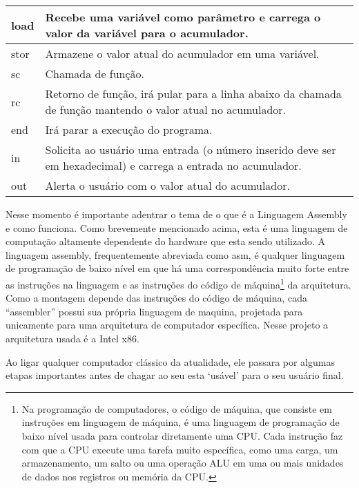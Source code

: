 \begin{longtable}{ |p{3cm}||p{11cm}|  }
  \hline
  load &
  Recebe uma variável como parâmetro e carrega o valor da variável para o acumulador. \\
  \hline
  stor &
  Armazene o valor atual do acumulador em uma variável. \\
  \hline
  sc &
  Chamada de função. \\
  \hline
  rc &
  Retorno de função, irá pular para a linha abaixo da chamada de função mantendo o valor atual no acumulador. \\
  \hline
  end &
  Irá parar a execução do programa. \\
  \hline
  in &
  Solicita ao usuário uma entrada (o número inserido deve ser em hexadecimal) e carrega a entrada no acumulador. \\
  \hline
  out &
  Alerta o usuário com o valor atual do acumulador. \\
  \hline
\end{longtable}
\vspace{1cm}

Nesse momento é importante adentrar o tema de o que é a Linguagem Assembly e como funciona. Como brevemente mencionado acima, esta é uma linguagem de computação altamente dependente do hardware que esta sendo utilizado. A linguagem assembly, frequentemente abreviada como asm, é qualquer linguagem de programação de baixo nível em que há uma correspondência muito forte entre as instruções na linguagem e as instruções do código de máquina\footnote{Na programação de computadores, o código de máquina, que consiste em instruções em linguagem de máquina, é uma linguagem de programação de baixo nível usada para controlar diretamente uma CPU. Cada instrução faz com que a CPU execute uma tarefa muito específica, como uma carga, um armazenamento, um salto ou uma operação ALU em uma ou mais unidades de dados nos registros ou memória da CPU.} da arquitetura. Como a montagem depende das instruções do código de máquina, cada ``assembler'' possui sua própria linguagem de maquina, projetada para unicamente para uma arquitetura de computador específica. Nesse projeto a arquitetura usada é a Intel x86.

Ao ligar qualquer computador clássico da atualidade, ele passara por algumas etapas importantes antes de chagar ao seu esta `usável' para o seu usuário final. 

